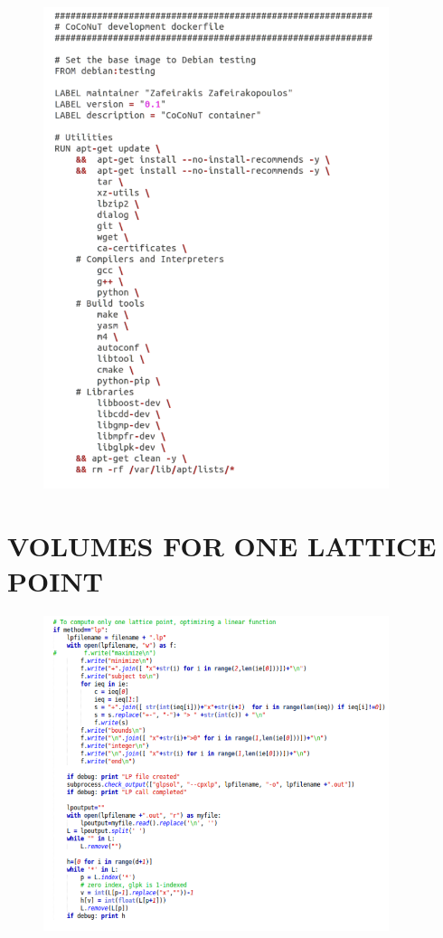 \documentclass[12pt,twoside]{article}
\begin{document}
	\begin{figure}[!h]
  		\centering
         	\includegraphics[width=0.90\textwidth]{utilities.png}
		
	\end{figure}	
\newpage
\section{VOLUMES FOR ONE LATTICE POINT}

\begin{figure}[!h]
  		\centering
         	\includegraphics[width=0.90\textwidth]{onelatte.png}
		
	\end{figure}	
\newpage
\end{document}
